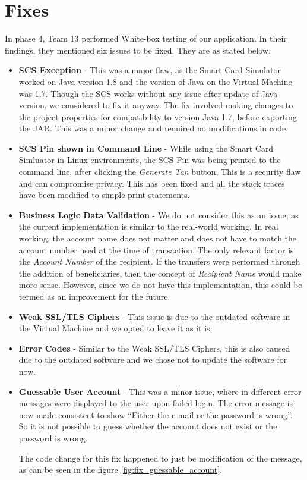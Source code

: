 \chapter{Fixes}

In phase 4, Team 13 performed White-box testing of our application. In their findings, they mentioned six issues to be fixed. They are as stated below.

\begin{itemize}
\item \textbf{SCS Exception} - This was a major flaw, as the Smart Card Simulator worked on Java version 1.8 and the version of Java on the Virtual Machine was 1.7. Though the SCS works without any issue after update of Java version, we considered to fix it anyway.
The fix involved making changes to the project properties for compatibility to version Java 1.7, before exporting the JAR. This was a minor change and required no modifications in code.

\item \textbf{SCS Pin shown in Command Line} - While using the Smart Card Simluator in Linux environments, the SCS Pin was being printed to the command line, after clicking the \textit{Generate Tan} button. This is a security flaw and can compromise privacy. This has been fixed and all the stack traces have been modified to simple print statements.

\item \textbf{Business Logic Data Validation} - We do not consider this as an issue, as the current implementation is similar to the real-world working. In real working, the account name does not matter and does not  have to match the account number used at the time of transaction. The only relevant factor is the \textit{Account Number} of the recipient. 
If the transfers were performed through the addition of beneficiaries, then the concept of \textit{Recipient Name} would make more sense. However, since we do not have this implementation, this could be termed as an improvement for the future.

\item \textbf{Weak SSL/TLS Ciphers} - This issue is due to the outdated software in the Virtual Machine and we opted to leave it as it is. 

\item \textbf{Error Codes} - Similar to the Weak SSL/TLS Ciphers, this is also caused due to the outdated software and we chose not to update the software for now.

\item \textbf{Guessable User Account} - This was a minor issue, where-in different error messages were displayed to the user upon failed login. The error message is now made consistent to show \enquote{Either the e-mail or the password is wrong}. So it is not possible to guess whether the account does not exist or the password is wrong.

The code change for this fix happened to just be modification of the message, as can be seen in the figure \ref{fig:fix_guessable_account}.

\end{itemize}

